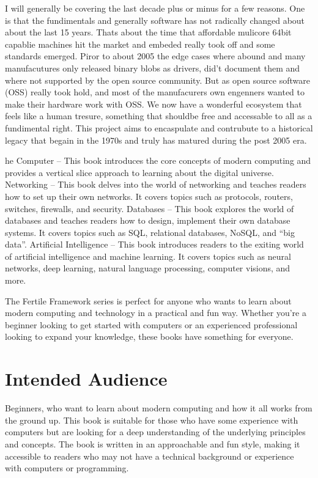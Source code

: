 I will generally be covering the last decade plus or minus for a few reasons. One is that the fundimentals and generally software has not radically changed about about the last 15 years. Thats about the time that affordable mulicore 64bit capablie machines hit the market and embeded really took off and some standards emerged. Piror to about 2005 the edge cases where abound and many manufacutures only released binary blobs as drivers, did’t document them and where not supported by the open source community. But as open source software (OSS) really took hold, and most of the manufacurers own engenners wanted to make their hardware work with OSS. We now have a wonderful ecosystem that feels like a human tresure, something that shouldbe free and accessable to all as a fundimental right. This project aims to encaspulate and contrubute to a historical legacy that begain in the 1970s and truly has matured during the post 2005 era.  

he Computer – This book introduces the core concepts of modern computing and provides a vertical slice approach to learning about the digital universe.
Networking – This book delves into the world of networking and teaches readers how to set up their own networks.  It covers topics such as protocols, routers, switches, firewalls, and security.
Databases – This book explores the world of databases and teaches readers how to design, implement their own database systems. It covers topics such as SQL, relational databases, NoSQL, and “big data”.
Artificial Intelligence – This book introduces readers to the exiting world of artificial intelligence and machine learning. It covers topics such as neural networks, deep learning, natural language processing, computer visions, and more.

The Fertile Framework series is perfect for anyone who wants to learn about modern computing and technology in a practical and fun way. Whether you're a beginner looking to get started with computers or an experienced professional looking to expand your knowledge, these books have something for everyone.

\section{Intended Audience}

Beginners, who want to learn about modern computing and how it all works from the ground up. This book is suitable for those who have some experience with computers but are looking for a deep understanding of the underlying principles and concepts. The book is written in an approachable and fun style, making it accessible to readers who may not have a technical background or experience with computers or programming.

